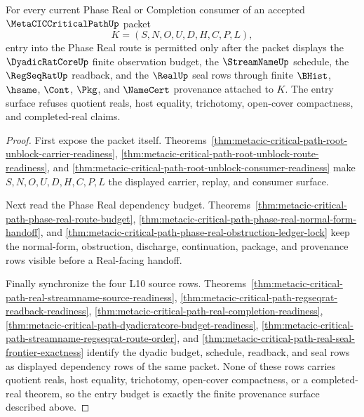 \begin{theorem}
\label{thm:metacic-critical-path-l10-entry-budget-synchronization}
For every current Phase Real or Completion consumer of an accepted $\MetaCICCriticalPathUp$ packet
$$
K=(S,N,O,U,D,H,C,P,L),
$$
entry into the Phase Real route is permitted only after the packet displays the $\DyadicRatCoreUp$ finite observation budget, the $\StreamNameUp$ schedule, the $\RegSeqRatUp$ readback, and the $\RealUp$ seal rows through finite $\BHist$, $\hsame$, $\Cont$, $\Pkg$, and $\NameCert$ provenance attached to $K$. The entry surface refuses quotient reals, host equality, trichotomy, open-cover compactness, and completed-real claims.
\end{theorem}
\begin{proof}
First expose the packet itself. Theorems~\ref{thm:metacic-critical-path-root-unblock-carrier-readiness}, \ref{thm:metacic-critical-path-root-unblock-route-readiness}, and \ref{thm:metacic-critical-path-root-unblock-consumer-readiness} make $S,N,O,U,D,H,C,P,L$ the displayed carrier, replay, and consumer surface.

Next read the Phase Real dependency budget. Theorems~\ref{thm:metacic-critical-path-phase-real-route-budget}, \ref{thm:metacic-critical-path-phase-real-normal-form-handoff}, and \ref{thm:metacic-critical-path-phase-real-obstruction-ledger-lock} keep the normal-form, obstruction, discharge, continuation, package, and provenance rows visible before a Real-facing handoff.

Finally synchronize the four L10 source rows. Theorems~\ref{thm:metacic-critical-path-real-streamname-source-readiness}, \ref{thm:metacic-critical-path-regseqrat-readback-readiness}, \ref{thm:metacic-critical-path-real-completion-readiness}, \ref{thm:metacic-critical-path-dyadicratcore-budget-readiness}, \ref{thm:metacic-critical-path-streamname-regseqrat-route-order}, and \ref{thm:metacic-critical-path-real-seal-frontier-exactness} identify the dyadic budget, schedule, readback, and seal rows as displayed dependency rows of the same packet. None of these rows carries quotient reals, host equality, trichotomy, open-cover compactness, or a completed-real theorem, so the entry budget is exactly the finite provenance surface described above.
\end{proof}

